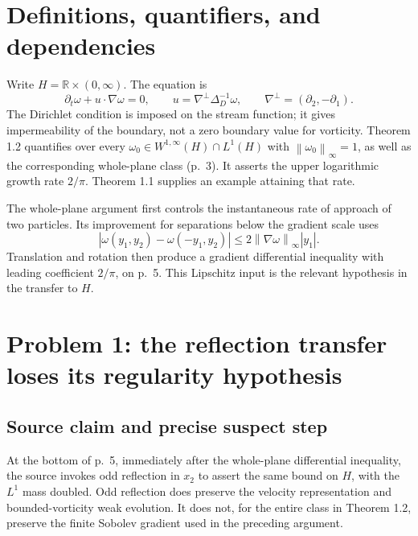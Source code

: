 \documentclass[10pt]{article}
\begin{document}
\section*{Definitions, quantifiers, and dependencies}
Write \(H=\mathbb R\times(0,\infty)\). The equation is \[\partial_t\omega+u\cdot\nabla\omega=0,\qquad
u=\nabla^\perp\Delta_D^{-1}\omega,\qquad
\nabla^\perp=(\partial_2,-\partial_1).\] The Dirichlet condition is imposed on the stream function; it gives impermeability of the boundary, not a zero boundary value for vorticity. Theorem 1.2 quantifies over every \(\omega_0\in W^{1,\infty}(H)\cap L^1(H)\) with \(\left\lVert\omega_0\right\rVert_\infty=1\), as well as the corresponding whole-plane class (p. 3). It asserts the upper logarithmic growth rate \(2/\pi\). Theorem 1.1 supplies an example attaining that rate.\par
The whole-plane argument first controls the instantaneous rate of approach of two particles. Its improvement for separations below the gradient scale uses \[|\omega(y_1,y_2)-\omega(-y_1,y_2)|
 \le 2\left\lVert\nabla\omega\right\rVert_\infty |y_1|.\] Translation and rotation then produce a gradient differential inequality with leading coefficient \(2/\pi\), on p. 5. This Lipschitz input is the relevant hypothesis in the transfer to \(H\).\par
\section*{Problem 1: the reflection transfer loses its regularity hypothesis}
\subsection*{Source claim and precise suspect step}
At the bottom of p. 5, immediately after the whole-plane differential inequality, the source invokes odd reflection in \(x_2\) to assert the same bound on \(H\), with the \(L^1\) mass doubled. Odd reflection does preserve the velocity representation and bounded-vorticity weak evolution. It does not, for the entire class in Theorem 1.2, preserve the finite Sobolev gradient used in the preceding argument.\par
\end{document}
